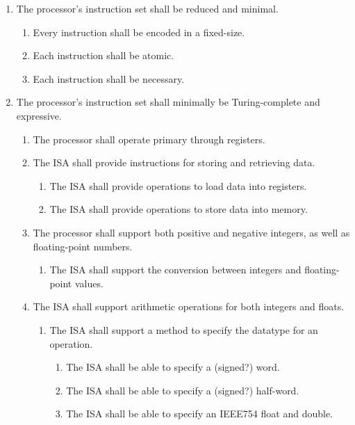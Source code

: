 \documentclass{article}
\begin{document}
\begin{enumerate}[label=R\arabic*]
    \item The processor's instruction set shall be reduced and minimal.
    \begin{enumerate}[label=\theenumi.\arabic*]
        \item Every instruction shall be encoded in a fixed-size.
        \item Each instruction shall be atomic.
        \item Each instruction shall be necessary.
    \end{enumerate}
    \item The processor's instruction set shall minimally be Turing-complete and expressive.
    \begin{enumerate}[label=\theenumi.\arabic*]
        \item The processor shall operate primary through registers.
        \item The ISA shall provide instructions for storing and retrieving data.
        \begin{enumerate}[label=\theenumii.\arabic*]
            \item The ISA shall provide operations to load data into registers.
            \item The ISA shall provide operations to store data into memory.
        \end{enumerate}
        \item The processor shall support both positive and negative integers, as well as floating-point numbers.
        \begin{enumerate}[label=\theenumii.\arabic*]
            \item The ISA shall support the conversion between integers and floating-point values.
        \end{enumerate}
        \item The ISA shall support arithmetic operations for both integers and floats.
        \begin{enumerate}[label=\theenumii.\arabic*]
            \item The ISA shall support a method to specify the datatype for an operation.
            \begin{enumerate}[label=\theenumiii.\arabic*]
                \item The ISA shall be able to specify a (signed?) word.
                \item The ISA shall be able to specify a (signed?) half-word.
                \item The ISA shall be able to specify an IEEE754 float and double.

\end{enumerate}
\end{enumerate}
\end{enumerate}
\end{enumerate}
\end{document}
